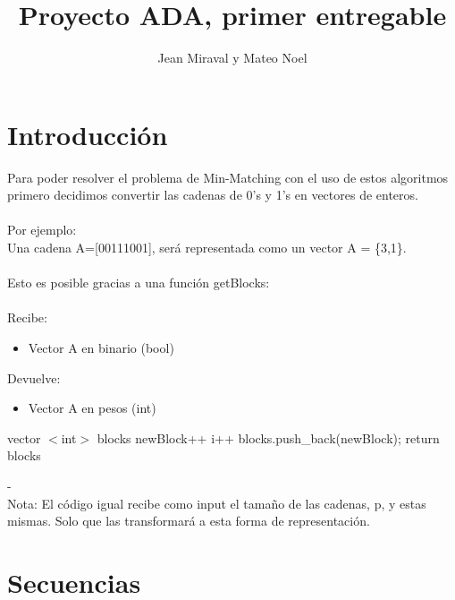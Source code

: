 \documentclass{article}
\title{Proyecto ADA, primer entregable}
\author{Jean Miraval y  Mateo Noel}
\newcommand{\TITLE}[1]{\item[#1]}
\begin{document}
	\maketitle
	\section{Introducción}
	Para poder resolver el problema de Min-Matching con el uso de estos algoritmos primero decidimos convertir las cadenas de 0's y 1's en vectores de enteros.\\\\
	Por ejemplo: \\Una cadena A=[00111001], será representada como un vector  A = \{3,1\}. \\\\
	Esto es posible gracias a una función getBlocks: \\\\
	Recibe:
	\begin{itemize}
		\item Vector A en binario (bool)
	\end{itemize}
	Devuelve: 
	\begin{itemize}
		\item Vector A en pesos (int)
	\end{itemize}
	\begin{algorithmic}[1]
		\TITLE{\textsc{getBlocks}$(A)$}
		\STATE vector $<$int$>$ blocks
		\STATE	newBlock++
		\STATE i++
		\ENDWHILE
		\STATE blocks.push\_back(newBlock);
		\ENDIF
		\STATE return blocks
		\ENDFOR
	\end{algorithmic}
	-\\
	Nota: El código igual recibe como input el tamaño de las cadenas, p, y estas mismas. Solo que las transformará a esta forma de representación.
	
	\section{Secuencias} 
\end{document}
